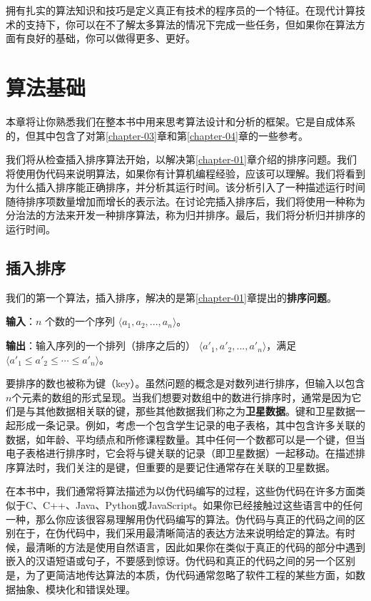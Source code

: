 \documentclass[lang=cn,newtx,10pt,scheme=chinese]{elegantbook}
\begin{document}
拥有扎实的算法知识和技巧是定义真正有技术的程序员的一个特征。在现代计算技术的支持下，你可以在不了解太多算法的情况下完成一些任务，但如果你在算法方面有良好的基础，你可以做得更多、更好。

\chapter{算法基础}\label{chapter-02}

本章将让你熟悉我们在整本书中用来思考算法设计和分析的框架。它是自成体系的，但其中包含了对第\ref{chapter-03}章和第\ref{chapter-04}章的一些参考。

我们将从检查插入排序算法开始，以解决第\ref{chapter-01}章介绍的排序问题。我们将使用伪代码来说明算法，如果你有计算机编程经验，应该可以理解。我们将看到为什么插入排序能正确排序，并分析其运行时间。该分析引入了一种描述运行时间随待排序项数量增加而增长的表示法。在讨论完插入排序后，我们将使用一种称为分治法的方法来开发一种排序算法，称为归并排序。最后，我们将分析归并排序的运行时间。

\section{插入排序}\label{section-2.1}

我们的第一个算法，插入排序，解决的是第\ref{chapter-01}章提出的\textbf{排序问题}。

\textbf{输入}：$n$ 个数的一个序列 $\langle a_1, a_2, ..., a_n\rangle$。

\textbf{输出}：输入序列的一个排列（排序之后的） $\langle{a'_1,a'_2,...,a'_n}\rangle$，满足$\langle{a'_1\le a'_2\le \cdots\le a'_n}\rangle$。

要排序的数也被称为键（key）。虽然问题的概念是对数列进行排序，但输入以包含$n$个元素的数组的形式呈现。当我们想要对数组中的数进行排序时，通常是因为它们是与其他数据相关联的键，那些其他数据我们称之为\textbf{卫星数据}。键和卫星数据一起形成一条记录。例如，考虑一个包含学生记录的电子表格，其中包含许多关联的数据，如年龄、平均绩点和所修课程数量。其中任何一个数都可以是一个键，但当电子表格进行排序时，它会将与键关联的记录（即卫星数据）一起移动。在描述排序算法时，我们关注的是键，但重要的是要记住通常存在关联的卫星数据。

在本书中，我们通常将算法描述为以伪代码编写的过程，这些伪代码在许多方面类似于C、C++、Java、Python或JavaScript。如果你已经接触过这些语言中的任何一种，那么你应该很容易理解用伪代码编写的算法。伪代码与真正的代码之间的区别在于，在伪代码中，我们采用最清晰简洁的表达方法来说明给定的算法。有时候，最清晰的方法是使用自然语言，因此如果你在类似于真正的代码的部分中遇到嵌入的汉语短语或句子，不要感到惊讶。伪代码和真正的代码之间的另一个区别是，为了更简洁地传达算法的本质，伪代码通常忽略了软件工程的某些方面，如数据抽象、模块化和错误处理。
\end{document}
